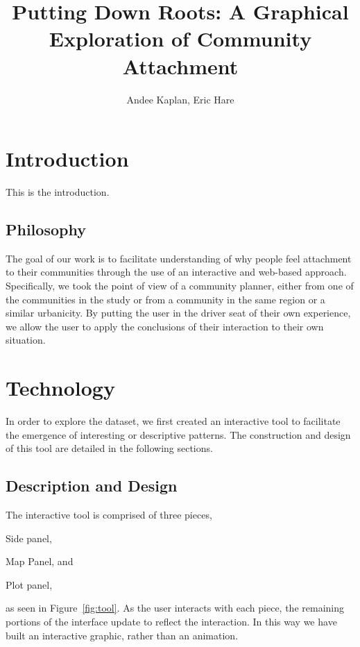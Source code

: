 \documentclass[11pt]{article}\usepackage{knitr}
\begin{document}
\setlength{\parskip}{3ex}
\setlength{\parindent}{0pt}

\title{Putting Down Roots: A Graphical Exploration of Community Attachment}
\author{Andee Kaplan, Eric Hare}

\maketitle

\setcounter{page}{1}
\section*{Introduction}

This is the introduction.

\subsection*{Philosophy}
The goal of our work is to facilitate understanding of why people feel attachment to their communities through the use of an interactive and web-based approach. Specifically, we took the point of view of a community planner, either from one of the communities in the study or from a community in the same region or a similar urbanicity. By putting the user in the driver seat of their own experience, we allow the user to apply the conclusions of their interaction to their own situation.


\section*{Technology}

In order to explore the dataset, we first created an interactive tool to facilitate the emergence of interesting or descriptive patterns. The construction and design of this tool are detailed in the following sections.

\subsection*{Description and Design}
The interactive tool is comprised of three pieces, \begin{inparaenum}[\itshape 1\upshape)]
\item Side panel, 
\item Map Panel, and
\item Plot panel,
\end{inparaenum}
as seen in Figure~\ref{fig:tool}.
As the user interacts with each piece, the remaining portions of the interface update to reflect the interaction. In this way we have built an interactive graphic, rather than an animation.
\end{document}
